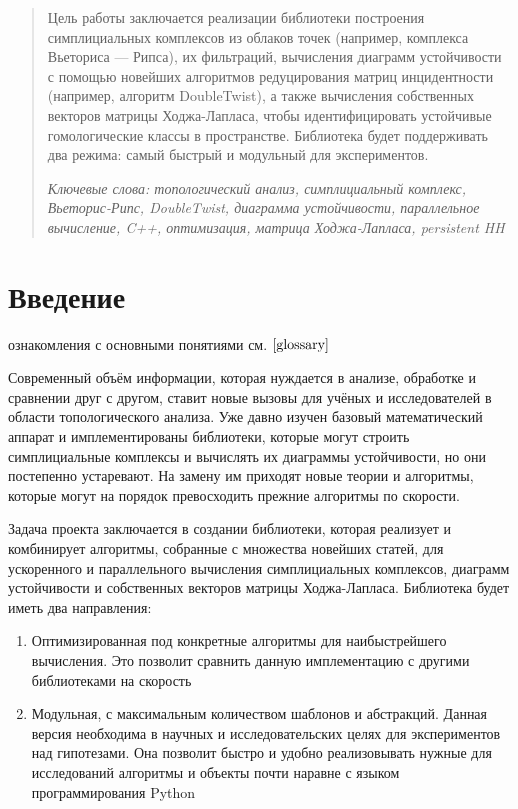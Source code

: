 \documentclass{article}
\begin{document}
\makeTitlePage

\tableofcontents
\newpage
\begin{abstract}
  Цель работы заключается реализации библиотеки построения симплициальных комплексов из облаков точек (например, комплекса Вьеториса — Рипса), их фильтраций, вычисления диаграмм устойчивости с помощью новейших алгоритмов редуцирования матриц инцидентности (например, алгоритм DoubleTwist), а также вычисления собственных векторов матрицы Ходжа-Лапласа, чтобы идентифицировать устойчивые гомологические классы в пространстве. Библиотека будет поддерживать два режима: самый быстрый и модульный для экспериментов.

  \textit{Ключевые слова: топологический анализ, симплициальный комплекс, Вьеторис-Рипс, DoubleTwist, диаграмма устойчивости, параллельное вычисление, C++, оптимизация, матрица Ходжа-Лапласа, persistent HH}
\end{abstract}
\section{Введение}


{ ознакомления с основными понятиями см. $\ref{glossary}$}

Современный объём информации, которая нуждается в анализе, обработке и сравнении друг с другом, ставит новые вызовы для учёных и исследователей в области топологического анализа. Уже давно изучен базовый математический аппарат и имплементированы библиотеки, которые могут строить симплициальные комплексы и вычислять их диаграммы устойчивости, но они постепенно устаревают. На замену им приходят новые теории и алгоритмы, которые могут на порядок превосходить прежние алгоритмы по скорости.

Задача проекта заключается в создании библиотеки, которая реализует и комбинирует алгоритмы, собранные с множества новейших статей, для ускоренного и параллельного вычисления симплициальных комплексов, диаграмм устойчивости и собственных векторов матрицы Ходжа-Лапласа. Библиотека будет иметь два направления:
\begin{enumerate}
  \item Оптимизированная под конкретные алгоритмы для наибыстрейшего вычисления. Это позволит сравнить данную имплементацию с другими библиотеками на скорость
  \item Модульная, с максимальным количеством шаблонов и абстракций. Данная версия необходима в научных и исследовательских целях для экспериментов над гипотезами. Она позволит быстро и удобно реализовывать нужные для исследований алгоритмы и объекты почти наравне с языком программирования Python
\end{enumerate}
\end{document}
